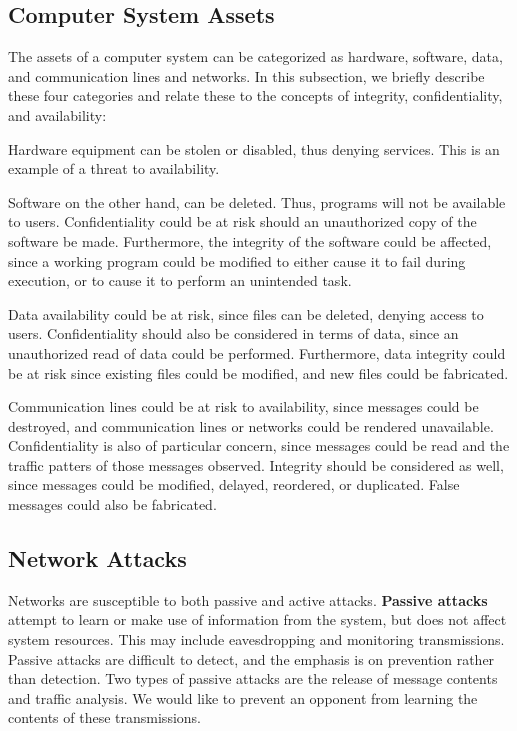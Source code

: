 \documentclass[11pt]{article}
\theoremstyle{plain} %
\theoremstyle{definition}
\theoremstyle{example}
\theoremstyle{remark}
\begin{document}
\subsection{Computer System Assets}

The assets of a computer system can be categorized as hardware, software, data, and communication lines and networks. In this subsection, we briefly describe these four categories and relate these to the concepts of integrity, confidentiality, and availability:

Hardware equipment can be stolen or disabled, thus denying services. This is an example of a threat to availability. 

Software on the other hand, can be deleted. Thus, programs will not be available to users. Confidentiality could be at risk should an unauthorized copy of the software be made. Furthermore, the integrity of the software could be affected, since a working program could be modified to either cause it to fail during execution, or to cause it to perform an unintended task. 

Data availability could be at risk, since files can be deleted, denying access to users. Confidentiality should also be considered in terms of data, since an unauthorized read of data could be performed. Furthermore, data integrity could be at risk since existing files could be modified, and new files could be fabricated. 

Communication lines could be at risk to availability, since messages could be destroyed, and communication lines or networks could be rendered unavailable. Confidentiality is also of particular concern, since messages could be read and the traffic patters of those messages observed. Integrity should be considered as well, since messages could be modified, delayed, reordered, or duplicated. False messages could also be fabricated. 

\subsection{Network Attacks}

Networks are susceptible to both passive and active attacks. \textbf{Passive attacks} attempt to learn or make use of information from the system, but does not affect system resources. This may include eavesdropping and monitoring transmissions. Passive attacks are difficult to detect, and the emphasis is on prevention rather than detection.  Two types of passive attacks are the release of message contents and traffic analysis. We would like to prevent an opponent from learning the contents of these transmissions.
\end{document}
